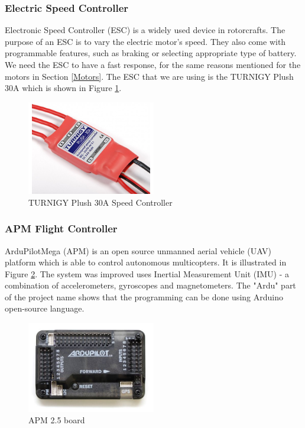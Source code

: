 \subsubsection{Electric Speed Controller}
Electronic Speed Controller (ESC) is a widely used device in rotorcrafts. The purpose of an ESC is to vary the electric motor's speed. They also come with programmable features, such as braking or selecting appropriate type of battery. We need the ESC to have a fast response, for the same reasons mentioned for the motors in Section \ref{Motors}. The ESC that we are using is the TURNIGY Plush 30A which is shown in Figure \ref{esc}.
 
\begin{figure}[H]
  \centering
    \includegraphics[width=0.5\textwidth]{images/esc.jpg}
	\caption{TURNIGY Plush 30A Speed Controller}
	\label{esc}
\end{figure}

\subsubsection{APM Flight Controller}
ArduPilotMega (APM) is an open source unmanned aerial vehicle (UAV) platform which is able to control autonomous multicopters. It is illustrated in Figure \ref{ardupilot}. The system was improved uses Inertial Measurement Unit (IMU) - a combination of accelerometers, gyroscopes and magnetometers. The "Ardu" part of the project name shows that the programming can be done using Arduino open-source language.

\begin{figure}[H]
  \centering
    \includegraphics[width=0.5\textwidth]{images/ardupilot.jpg}
	\caption{APM 2.5 board}
	\label{ardupilot}
\end{figure}

